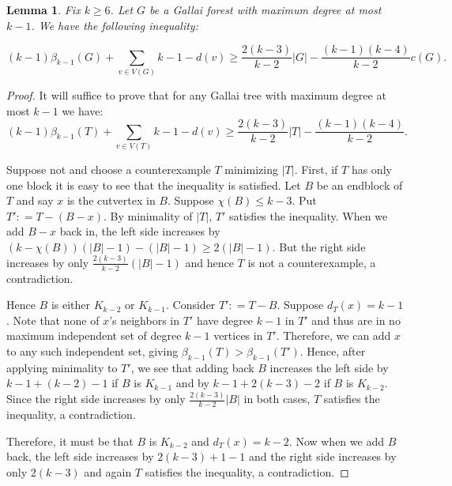 \documentclass[12pt]{article}
\theoremstyle{plain}
\newtheorem{lem}[thm]{Lemma}
\theoremstyle{definition}
\theoremstyle{remark}
\newcommand{\card}[1]{\left|#1\right|}
\newcommand{\DefinedAs}{\mathrel{\mathop:}=}
\begin{document}
\begin{lem}\label{GallaiTreeCount}
Fix $k \geq 6$. Let $G$ be a Gallai forest with maximum degree at most $k-1$.  We have the following inequality:

\[(k-1)\beta_{k-1}(G) + \sum_{v \in V(G)} k-1 - d(v) \geq \frac{2(k-3)}{k-2}\card{G} - \frac{(k-1)(k-4)}{k-2}c(G).\]
\end{lem}
\begin{proof}
It will suffice to prove that for any Gallai tree with maximum degree at most $k-1$ we have:
\[(k-1)\beta_{k-1}(T) + \sum_{v \in V(T)} k-1 - d(v) \geq \frac{2(k-3)}{k-2}\card{T} - \frac{(k-1)(k-4)}{k-2}.\]

Suppose not and choose a counterexample $T$ minimizing $\card{T}$.  First, if $T$ has only one block it is easy to see that the inequality is satisfied.  Let $B$ be an endblock of $T$ and say $x$ is the cutvertex in $B$.  Suppose $\chi(B) \leq k-3$.  Put $T' \DefinedAs T - (B-x)$.  By minimality of $\card{T}$, $T'$ satisfies the inequality.  When we add $B-x$ back in, the left side increases by $(k-\chi(B))(\card{B}-1) - (\card{B} - 1) \geq 2(\card{B} - 1)$.  But the right side increases by only $\frac{2(k-3)}{k-2}(\card{B} - 1)$ and hence $T$ is not a counterexample, a contradiction.

Hence $B$ is either $K_{k-2}$ or $K_{k-1}$.  Consider $T' \DefinedAs T - B$.  Suppose $d_T(x) = k-1$. Note that none of $x$'s neighbors in $T'$ have degree $k-1$ in $T'$ and thus are in no maximum independent set of degree $k-1$ vertices in $T'$.  Therefore, we can add $x$ to any such independent set, giving $\beta_{k-1}(T) > \beta_{k-1}(T')$.  Hence, after applying minimality to $T'$, we see that adding back $B$ increases the left side by $k-1 + (k-2) - 1$ if $B$ is $K_{k-1}$ and by $k-1 + 2(k-3) - 2$ if $B$ is $K_{k-2}$.  Since the right side increases by only $\frac{2(k-3)}{k-2}\card{B}$ in both cases, $T$ satisfies the inequality, a contradiction.

Therefore, it must be that $B$ is $K_{k-2}$ and $d_T(x) = k-2$.  Now when we add $B$ back, the left side increases by $2(k-3) + 1 - 1$ and the right side increases by only $2(k-3)$ and again $T$ satisfies the inequality, a contradiction.
\end{proof}
\end{document}
